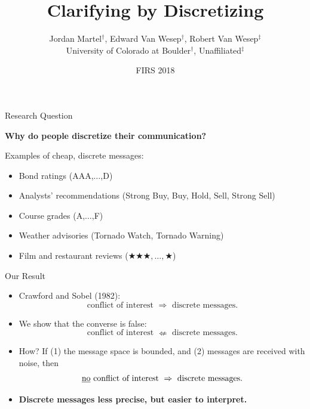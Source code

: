 \documentclass[hyperref={colorlinks=true,linkcolor=blue,citecolor=blue}]{beamer}
\title{Clarifying by Discretizing}
\author{Jordan Martel$^{\dagger}$, Edward Van Wesep$^{\dagger}$, Robert Van Wesep$^{\ddagger}$\\{\small University of Colorado at Boulder$^{\dagger}$, Unaffiliated$^{\ddagger}$}}
\date{FIRS 2018}
\begin{document}
\maketitle
\begin{frame}{Research Question}
\begin{center}
\textbf{Why do people discretize their communication?}
\end{center}
\vspace{.25in}
\pause
Examples of cheap, discrete messages:
\begin{itemize}
\item Bond ratings (AAA,$\ldots$,D)
\item Analysts' recommendations (Strong Buy, Buy, Hold, Sell, Strong Sell)
\item Course grades (A,$\ldots$,F)
\item Weather advisories (Tornado Watch, Tornado Warning)
\item Film and restaurant reviews ($\bigstar\bigstar\bigstar,\ldots,\bigstar$)  
\end{itemize}
\end{frame}

\begin{frame}{Our Result}
\begin{itemize}
\item Crawford and Sobel (1982): 
\begin{equation*}
\text{conflict of interest }\Rightarrow\text{ discrete messages}.
\end{equation*}
\item We show that the converse is false:
\begin{equation*}
\text{conflict of interest }\nLeftarrow\text{ discrete messages}.
\end{equation*}
\item How? If (1) the message space is bounded, and (2) messages are received with noise, then 
\begin{equation*}
\text{\underline{no} conflict of interest }\Rightarrow\text{ discrete messages}.
\end{equation*}
\item \textbf{Discrete messages less precise, but easier to interpret.}
\end{itemize}
\end{frame}
\end{document}
